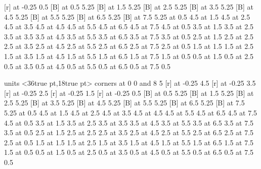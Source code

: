  [r] at -0.25 0.5
 [B] at 0.5 5.25
 [B] at 1.5 5.25
 [B] at 2.5 5.25
 [B] at 3.5 5.25
 [B] at 4.5 5.25
 [B] at 5.5 5.25
 [B] at 6.5 5.25
 [B] at 7.5 5.25
 at 0.5 4.5
 at 1.5 4.5
 at 2.5 4.5
 at 3.5 4.5
 at 4.5 4.5
 at 5.5 4.5
 at 6.5 4.5
 at 7.5 4.5
 at 0.5 3.5
 at 1.5 3.5
 at 2.5 3.5
 at 3.5 3.5
 at 4.5 3.5
 at 5.5 3.5
 at 6.5 3.5
 at 7.5 3.5
 at 0.5 2.5
 at 1.5 2.5
 at 2.5 2.5
 at 3.5 2.5
 at 4.5 2.5
 at 5.5 2.5
 at 6.5 2.5
 at 7.5 2.5
 at 0.5 1.5
 at 1.5 1.5
 at 2.5 1.5
 at 3.5 1.5
 at 4.5 1.5
 at 5.5 1.5
 at 6.5 1.5
 at 7.5 1.5
 at 0.5 0.5
 at 1.5 0.5
 at 2.5 0.5
 at 3.5 0.5
 at 4.5 0.5
 at 5.5 0.5
 at 6.5 0.5
 at 7.5 0.5
\endpicture
\bigskip

\beginpicture
\setcoordinatesystem units <36true pt,18true pt>
\putrectangle corners at 0 0 and 8 5
 [r] at -0.25 4.5
 [r] at -0.25 3.5
 [r] at -0.25 2.5
 [r] at -0.25 1.5
 [r] at -0.25 0.5
 [B] at 0.5 5.25
 [B] at 1.5 5.25
 [B] at 2.5 5.25
 [B] at 3.5 5.25
 [B] at 4.5 5.25
 [B] at 5.5 5.25
 [B] at 6.5 5.25
 [B] at 7.5 5.25
 at 0.5 4.5
 at 1.5 4.5
 at 2.5 4.5
 at 3.5 4.5
 at 4.5 4.5
 at 5.5 4.5
 at 6.5 4.5
 at 7.5 4.5
 at 0.5 3.5
 at 1.5 3.5
 at 2.5 3.5
 at 3.5 3.5
 at 4.5 3.5
 at 5.5 3.5
 at 6.5 3.5
 at 7.5 3.5
 at 0.5 2.5
 at 1.5 2.5
 at 2.5 2.5
 at 3.5 2.5
 at 4.5 2.5
 at 5.5 2.5
 at 6.5 2.5
 at 7.5 2.5
 at 0.5 1.5
 at 1.5 1.5
 at 2.5 1.5
 at 3.5 1.5
 at 4.5 1.5
 at 5.5 1.5
 at 6.5 1.5
 at 7.5 1.5
 at 0.5 0.5
 at 1.5 0.5
 at 2.5 0.5
 at 3.5 0.5
 at 4.5 0.5
 at 5.5 0.5
 at 6.5 0.5
 at 7.5 0.5
